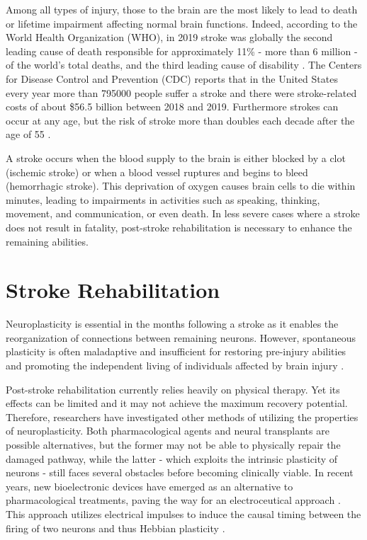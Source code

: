 Among all types of injury, those to the brain are the most likely to lead to death or lifetime impairment affecting normal brain functions. Indeed, according to the World Health Organization (WHO), in 2019 stroke was globally the second leading cause of death responsible for approximately 11\% - more than 6 million - of the world's total deaths, and the third leading cause of disability \cite{WHO2020}. The Centers for Disease Control and Prevention (CDC) reports that in the United States every year more than 795000 people suffer a stroke and there were stroke-related costs of about \$56.5 billion between 2018 and 2019. Furthermore strokes can occur at any age, but the risk of stroke more than doubles each decade after the age of 55 \cite{Tsaoetal2023}. 

A stroke occurs when the blood supply to the brain is either blocked by a clot (ischemic stroke) or when a blood vessel ruptures and begins to bleed (hemorrhagic stroke). This deprivation of oxygen causes brain cells to die within minutes, leading to impairments in activities such as speaking, thinking, movement, and communication, or even death. In less severe cases where a stroke does not result in fatality, post-stroke rehabilitation is necessary to enhance the remaining abilities.

\section{Stroke Rehabilitation}

Neuroplasticity is essential in the months following a stroke \cite{Nudo2013} \cite{Zeiler2013} as it enables the reorganization of connections between remaining neurons.
However, spontaneous plasticity is often maladaptive and insufficient for restoring pre-injury abilities \cite{Freed1985} and promoting the independent living of individuals affected by brain injury \cite{Patel2000}. 

Post-stroke rehabilitation currently relies heavily on physical therapy. Yet its effects can be limited and it may not achieve the maximum recovery potential. Therefore, researchers have investigated other methods of utilizing the properties of neuroplasticity.
Both pharmacological agents and neural transplants \cite{Palma-Tortosa2021} are possible alternatives, but the former may not be able to physically repair the damaged pathway, while the latter - which exploits the intrinsic plasticity of neurons - still faces several obstacles before becoming clinically viable.
In recent years, new bioelectronic devices \cite{Panuccio2018,Semprini2018} have emerged as an alternative to pharmacological treatments, paving the way for an electroceutical approach \cite{Famm2013,Reardon2014}. This approach utilizes electrical impulses to induce the causal timing between the firing of two neurons and thus Hebbian plasticity \cite{Markram1997}.

